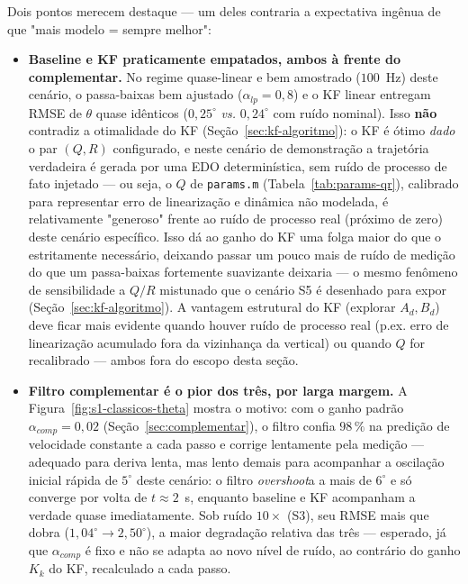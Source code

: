 \documentclass[brazil, 12pt]{article}
\begin{document}
Dois pontos merecem destaque — um deles contraria a expectativa ingênua de que
"mais modelo = sempre melhor":

\begin{itemize}
  \item \textbf{Baseline e KF praticamente empatados, ambos à frente do
  complementar.} No regime quase-linear e bem amostrado ($100$~Hz) deste
  cenário, o passa-baixas bem ajustado ($\alpha_{lp}=0{,}8$) e o KF linear
  entregam RMSE de $\theta$ quase idênticos ($0{,}25^{\circ}$ \emph{vs.}
  $0{,}24^{\circ}$ com ruído nominal). Isso \textbf{não} contradiz a
  otimalidade do KF (Seção~\ref{sec:kf-algoritmo}): o KF é ótimo
  \emph{dado} o par $(Q,R)$ configurado, e neste cenário de demonstração a
  trajetória verdadeira é gerada por uma EDO determinística, sem ruído de
  processo de fato injetado — ou seja, o $Q$ de \texttt{params.m}
  (Tabela~\ref{tab:params-qr}), calibrado para representar erro de
  linearização e dinâmica não modelada, é relativamente "generoso" frente ao
  ruído de processo real (próximo de zero) deste cenário específico. Isso dá
  ao ganho do KF uma folga maior do que o estritamente necessário, deixando
  passar um pouco mais de ruído de medição do que um passa-baixas
  fortemente suavizante deixaria — o mesmo fenômeno de sensibilidade a
  $Q/R$ mistunado que o cenário S5 é desenhado para expor
  (Seção~\ref{sec:kf-algoritmo}). A vantagem estrutural do KF (explorar
  $A_d,B_d$) deve ficar mais evidente quando houver ruído de processo real
  (p.ex. erro de linearização acumulado fora da vizinhança da vertical) ou
  quando $Q$ for recalibrado — ambos fora do escopo desta seção.

  \item \textbf{Filtro complementar é o pior dos três, por larga margem.} A
  Figura~\ref{fig:s1-classicos-theta} mostra o motivo: com o ganho padrão
  $\alpha_{comp}=0{,}02$ (Seção~\ref{sec:complementar}), o filtro confia
  $98\,\%$ na predição de velocidade constante a cada passo e corrige
  lentamente pela medição — adequado para deriva lenta, mas lento demais
  para acompanhar a oscilação inicial rápida de $5^{\circ}$ deste cenário: o
  filtro \emph{overshoot}a a mais de $6^{\circ}$ e só converge por volta de
  $t\approx2$~s, enquanto baseline e KF acompanham a verdade quase
  imediatamente. Sob ruído $10\times$ (S3), seu RMSE mais que dobra
  ($1{,}04^{\circ}\to2{,}50^{\circ}$), a maior degradação relativa das três
  — esperado, já que $\alpha_{comp}$ é fixo e não se adapta ao novo nível de
  ruído, ao contrário do ganho $K_k$ do KF, recalculado a cada passo.
\end{itemize}
\end{document}
